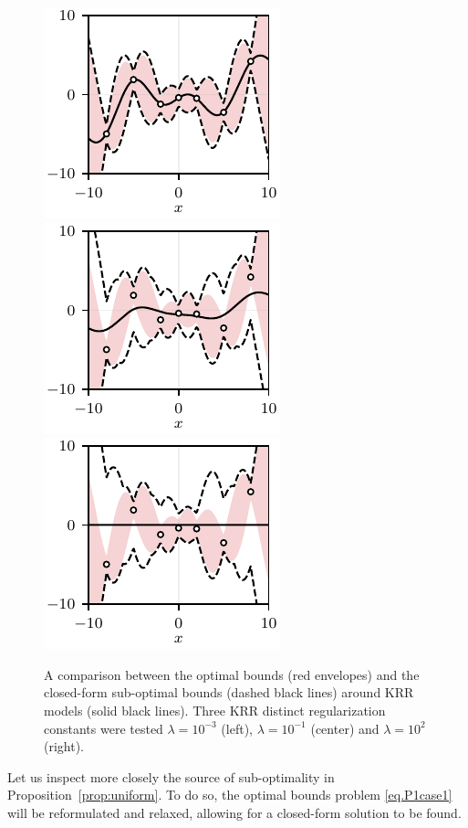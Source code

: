 \begin{figure}[b]
	\centering
	\includegraphics{../images/chap2_ex4_cf_bounds_A.pdf} 
	\includegraphics{../images/chap2_ex4_cf_bounds_B.pdf} 
	\includegraphics{../images/chap2_ex4_cf_bounds_C.pdf} 
	\caption{A comparison between the optimal bounds (red envelopes) and the closed-form sub-optimal bounds (dashed black lines) around KRR models (solid black lines). Three KRR distinct regularization constants were tested $\lambda = 10^{-3}$ (left), $\lambda = 10^{-1}$ (center) and $\lambda = 10^{2}$ (right).}
	\label{fig.ex4}
\end{figure}

\FloatBarrier

Let us inspect more closely the source of sub-optimality in Proposition~\ref{prop:uniform}. To do so, the optimal bounds problem \eqref{eq.P1case1} will be reformulated and relaxed, allowing for a closed-form solution to be found. 

